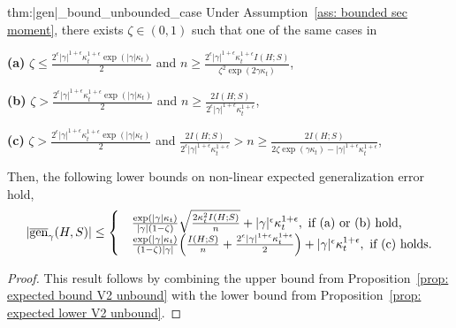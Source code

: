 \documentclass{article}
\theoremstyle{plain}
\theoremstyle{plain}
\theoremstyle{definition}
\theoremstyle{remark}
\begin{document}
\begin{tcolorbox}
    \begin{reptheorem}{thm:|gen|_bound_unbounded_case}
  Under Assumption~\ref{ass: bounded sec moment}, there exists $\zeta\in(0,1)$ such that one of the same cases in 

\textbf{(a)} $\zeta \leq \frac{2^{\epsilon}|\gamma|^{1+\epsilon} \kappa_t^{1+\epsilon} \exp(|\gamma|\kappa_t)}{2}$ and  $n \geq \frac{2^{\epsilon}|\gamma|^{1+\epsilon} \kappa_t^{1+\epsilon} I(H;S)}{\zeta^2\exp(2\gamma \kappa_t)}$,

\textbf{(b)} $\zeta > \frac{2^{\epsilon}|\gamma|^{1+\epsilon} \kappa_t^{1+\epsilon} \exp(|\gamma|\kappa_t)}{2}$ and $n \geq \frac{2I(H;S)}{2^{\epsilon}|\gamma|^{1+\epsilon} \kappa_t^{1+\epsilon}}$,

\textbf{(c)} $\zeta > \frac{2^{\epsilon}|\gamma|^{1+\epsilon} \kappa_t^{1+\epsilon} \exp(|\gamma|\kappa_t)}{2}$ and $\frac{2I(H;S)}{2^{\epsilon}|\gamma|^{1+\epsilon} \kappa_t^{1+\epsilon}} > n \geq \frac{2I(H;S)}{2\zeta \exp(\gamma\kappa_t)-|\gamma|^{1+\epsilon} \kappa_t^{1+\epsilon}}$,
    
    Then, the following lower bounds on non-linear expected generalization error hold,
\begin{equation*}
    \begin{split}
         |\overline{\mathrm{gen}}_{\gamma}(H,S)|\leq  \begin{cases}
           &\frac{\exp(|\gamma| \kappa_t)}{|\gamma|(1-\zeta)} \sqrt{\frac{2\kappa_t^2 I(H;S)}{n}}+|\gamma|^\epsilon\kappa_t^{1+\epsilon}, \mbox{ \text{if (a) or (b) hold,}}\\
              &\frac{\exp(|\gamma| \kappa_t)}{(1-\zeta) |\gamma|}\Big( \frac{ I(H;S)}{n}+\frac{2^{\epsilon}|\gamma|^{1+\epsilon} \kappa_t^{1+\epsilon}}{2}\Big)+|\gamma|^\epsilon\kappa_t^{1+\epsilon}, \mbox{ \text{if (c) holds}}.
          \end{cases}
    \end{split}
\end{equation*}
\end{reptheorem}

\end{tcolorbox}
\begin{proof}
   This result follows by combining the upper bound from Proposition~\ref{prop: expected bound V2 unbound} with the lower bound from Proposition~\ref{prop: expected lower V2 unbound}.
\end{proof}
\end{document}
